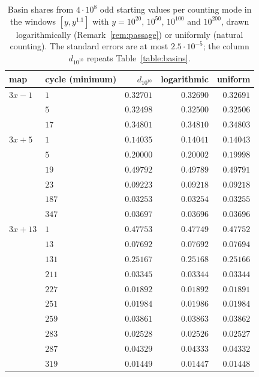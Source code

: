 \documentclass[12pt]{amsart}
\theoremstyle{definition}
\theoremstyle{remark}
\begin{document}
\begin{table}[H]
\centering
\small
\begin{tabular}{llrrr}
\toprule
map & cycle (minimum) & $d_{10^{10}}$ & logarithmic & uniform \\
\midrule
$3x-1$ & $1$ & $0.32701$ & $0.32690$ & $0.32691$ \\
 & $5$ & $0.32498$ & $0.32500$ & $0.32506$ \\
 & $17$ & $0.34801$ & $0.34810$ & $0.34803$ \\
\midrule
$3x+5$ & $1$ & $0.14035$ & $0.14041$ & $0.14043$ \\
 & $5$ & $0.20000$ & $0.20002$ & $0.19998$ \\
 & $19$ & $0.49792$ & $0.49789$ & $0.49791$ \\
 & $23$ & $0.09223$ & $0.09218$ & $0.09218$ \\
 & $187$ & $0.03253$ & $0.03254$ & $0.03255$ \\
 & $347$ & $0.03697$ & $0.03696$ & $0.03696$ \\
\midrule
$3x+13$ & $1$ & $0.47753$ & $0.47749$ & $0.47752$ \\
 & $13$ & $0.07692$ & $0.07692$ & $0.07694$ \\
 & $131$ & $0.25167$ & $0.25168$ & $0.25166$ \\
 & $211$ & $0.03345$ & $0.03344$ & $0.03344$ \\
 & $227$ & $0.01892$ & $0.01892$ & $0.01891$ \\
 & $251$ & $0.01984$ & $0.01986$ & $0.01984$ \\
 & $259$ & $0.03861$ & $0.03863$ & $0.03862$ \\
 & $283$ & $0.02528$ & $0.02526$ & $0.02527$ \\
 & $287$ & $0.04329$ & $0.04333$ & $0.04332$ \\
 & $319$ & $0.01449$ & $0.01447$ & $0.01448$ \\
\bottomrule
\end{tabular}
\caption{Basin shares from $4\cdot10^8$ odd starting values per counting mode in the windows $[y,y^{1.1}]$ with $y=10^{20}$, $10^{50}$, $10^{100}$ and $10^{200}$, drawn logarithmically (Remark~\ref{rem:passage}) or uniformly (natural counting). The standard errors are at most $2.5\cdot10^{-5}$; the column $d_{10^{10}}$ repeats Table~\ref{table:basins}.}
\label{table:passage}
\end{table}
\end{document}
